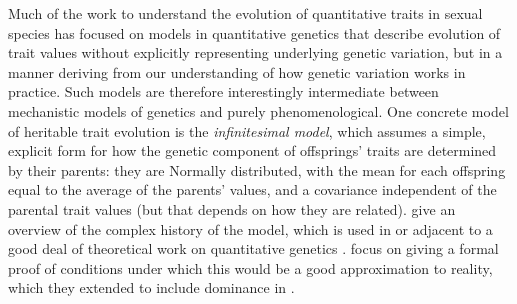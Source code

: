 \documentclass{article}
\newcommand{\1}{\mathbbm{1}}
\theoremstyle{remark}
\theoremstyle{definition}
\begin{document}
Much of the work to 
understand the evolution of quantitative traits in sexual species
has focused on models in quantitative genetics
that describe evolution of trait values without explicitly representing underlying genetic variation,
but in a manner deriving from our understanding of how genetic variation works in practice.
Such models are therefore
interestingly intermediate between mechanistic models of genetics and purely phenomenological.
One concrete model of heritable trait evolution is the \emph{infinitesimal model},
which assumes a simple, explicit form for how the genetic component of offsprings' traits are determined by their parents:
they are Normally distributed, with the mean for each offspring equal to the average of the parents' values,
and a covariance independent of the parental trait values (but that depends on how they are related).
\citet{barton2017infinitesimal} give an overview of the complex history of the model, 
which is used in or adjacent to a good deal of theoretical work on quantitative genetics
\citep[e.g.,][]{fisher1918correlation,bulmer1971effect,lande1975maintenance}.
\citet{barton2017infinitesimal} focus on giving a formal proof of conditions
under which this would be a good approximation to reality,
which they extended to include dominance in \citet{barton2022infinitesimal}.
\end{document}
